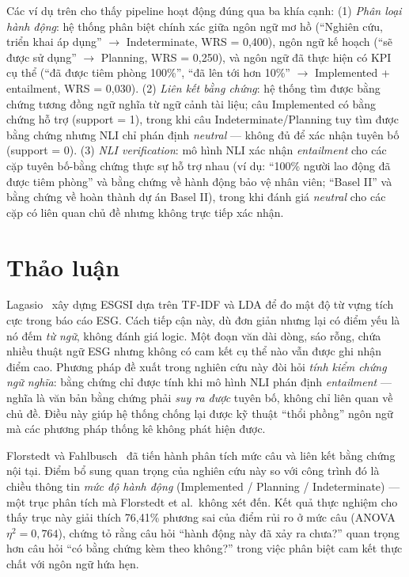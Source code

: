 Các ví dụ trên cho thấy pipeline hoạt động đúng qua ba khía cạnh: (1) \textit{Phân loại hành động}: hệ thống phân biệt chính xác giữa ngôn ngữ mơ hồ (``Nghiên cứu, triển khai áp dụng'' $\to$ Indeterminate, WRS = 0,400), ngôn ngữ kế hoạch (``sẽ được sử dụng'' $\to$ Planning, WRS = 0,250), và ngôn ngữ đã thực hiện có KPI cụ thể (``đã được tiêm phòng 100\%'', ``đã lên tới hơn 10\%'' $\to$ Implemented + entailment, WRS = 0,030). (2) \textit{Liên kết bằng chứng}: hệ thống tìm được bằng chứng tương đồng ngữ nghĩa từ ngữ cảnh tài liệu; câu Implemented có bằng chứng hỗ trợ (support = 1), trong khi câu Indeterminate/Planning tuy tìm được bằng chứng nhưng NLI chỉ phán định \textit{neutral} --- không đủ để xác nhận tuyên bố (support = 0). (3) \textit{NLI verification}: mô hình NLI xác nhận \textit{entailment} cho các cặp tuyên bố-bằng chứng thực sự hỗ trợ nhau (ví dụ: ``100\% người lao động đã được tiêm phòng'' và bằng chứng về hành động bảo vệ nhân viên; ``Basel II'' và bằng chứng về hoàn thành dự án Basel II), trong khi đánh giá \textit{neutral} cho các cặp có liên quan chủ đề nhưng không trực tiếp xác nhận.

\section{Thảo luận}
\label{sec:discussion}

Lagasio~\cite{lagasio2024esg} xây dựng ESGSI dựa trên TF-IDF và LDA để đo mật độ từ vựng tích cực trong báo cáo ESG. Cách tiếp cận này, dù đơn giản nhưng lại có điểm yếu là nó đếm \textit{từ ngữ}, không đánh giá logic. Một đoạn văn dài dòng, sáo rỗng, chứa nhiều thuật ngữ ESG nhưng không có cam kết cụ thể nào vẫn được ghi nhận điểm cao. Phương pháp đề xuất trong nghiên cứu này đòi hỏi \textit{tính kiểm chứng ngữ nghĩa}: bằng chứng chỉ được tính khi mô hình NLI phán định \textit{entailment} --- nghĩa là văn bản bằng chứng phải \textit{suy ra được} tuyên bố, không chỉ liên quan về chủ đề. Điều này giúp hệ thống chống lại được kỹ thuật ``thổi phồng'' ngôn ngữ mà các phương pháp thống kê không phát hiện được.

Florstedt và Fahlbusch~\cite{florstedt2025detecting} đã tiến hành phân tích mức câu và liên kết bằng chứng nội tại. Điểm bổ sung quan trọng của nghiên cứu này so với công trình đó là chiều thông tin \textit{mức độ hành động} (Implemented / Planning / Indeterminate) --- một trục phân tích mà Florstedt et al.\ không xét đến. Kết quả thực nghiệm cho thấy trục này giải thích 76,41\% phương sai của điểm rủi ro ở mức câu (ANOVA $\eta^2 = 0{,}764$), chứng tỏ rằng câu hỏi ``hành động này đã xảy ra chưa?'' quan trọng hơn câu hỏi ``có bằng chứng kèm theo không?'' trong việc phân biệt cam kết thực chất với ngôn ngữ hứa hẹn.

